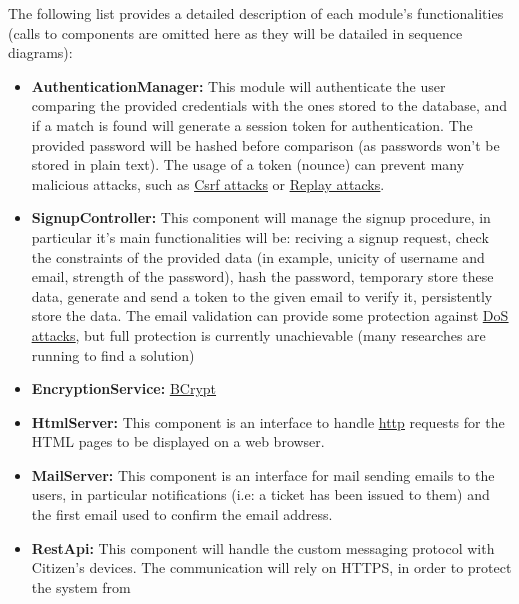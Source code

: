 \documentclass{article}
\newcommand{\link}[2]{{\color{blue}\underline{\href{#1}{#2}}}}
\begin{document}
	\FloatBarrier
	The following list provides a detailed description of each module's functionalities (calls to components are omitted here as they will be
	datailed in sequence diagrams):
	\begin{itemize}
		\item \label{component:AuthenticationManager} \textbf{AuthenticationManager:}
			This module will authenticate the user comparing the provided credentials with the ones stored to the database, and if a match is found
			will generate a session token for authentication. The provided password will be hashed before comparison (as passwords won't be stored
			in plain text). The usage of a token (nounce) can prevent many malicious attacks, such as 
		 	\link{https://en.wikipedia.org/wiki/Cross-site_request_forgery}{Csrf attacks} or 
			\link{https://en.wikipedia.org/wiki/Replay_attack}{Replay attacks}. 
		 \item \label{component:SignupController} \textbf{SignupController:} 
		 	This component will manage the signup procedure, in particular it's main functionalities will be: reciving a signup request, check the
		 	constraints of the provided data (in example, unicity of username and email, strength of the password), hash the password, temporary store these data, 
		 	generate and send a token to the given email to verify it, persistently store the data. The email validation can provide some protection against
		 	\link{https://en.wikipedia.org/wiki/Denial-of-service_attack}{DoS attacks}, but full protection is
		 	currently unachievable (many researches are running to find a solution)
		 \item \label{component:EncryptionService} \textbf{EncryptionService:}
		 	\link{https://en.wikipedia.org/wiki/Bcrypt}{BCrypt}
		 \item \label{component:HtmlServer} \textbf{HtmlServer:}
		 	This component is an interface to handle \link{https://en.wikipedia.org/wiki/Hypertext_Transfer_Protocol}{http} requests for the HTML pages to be displayed
		 	on a web browser. 
		 \item \label{component:MailServer} \textbf{MailServer:} 
		 	This component is an interface for mail sending emails to the users, in particular notifications (i.e: a ticket has been issued to them) and the first email
		 	used to confirm the email address.
		 \item \label{component:RestApi} \textbf{RestApi:} 
		 	This component will handle the custom messaging protocol with Citizen's devices. The communication will rely on HTTPS, in order to protect the system from 

\end{itemize}
\end{document}
